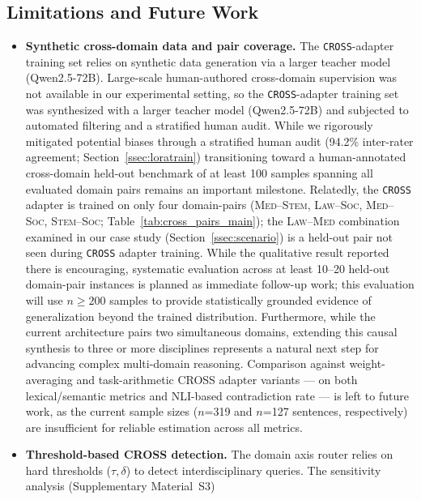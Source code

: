\documentclass[a4paper,fleql,doubleblind]{cas-sc}
\begin{document}
\subsection{Limitations and Future Work}
\label{sec:limitations}
\begin{itemize}
\item \textbf{Synthetic cross-domain data and pair coverage.}
The \texttt{CROSS}-adapter training set relies on synthetic data generation via a
larger teacher model (Qwen2.5-72B). Large-scale human-authored cross-domain supervision was not available in our experimental setting, so the \texttt{CROSS}-adapter training set was synthesized with a larger teacher model (Qwen2.5-72B) and subjected to automated filtering and a stratified human audit. While we rigorously mitigated potential biases through
a stratified human audit (94.2\% inter-rater agreement;
Section~\ref{ssec:loratrain}) transitioning toward a human-annotated cross-domain held-out benchmark
of at least 100 samples spanning all evaluated domain pairs remains an
important milestone. Relatedly, the \texttt{CROSS} adapter is trained on only four
domain-pairs (\textsc{Med}--\textsc{Stem}, \textsc{Law}--\textsc{Soc},
\textsc{Med}--\textsc{Soc}, \textsc{Stem}--\textsc{Soc};
Table~\ref{tab:cross_pairs_main}); the \textsc{Law}--\textsc{Med} combination
examined in our case study (Section~\ref{ssec:scenario}) is a held-out pair
not seen during \texttt{CROSS} adapter training. While the qualitative result reported there is encouraging, systematic
evaluation across at least 10--20 held-out domain-pair instances is planned
as immediate follow-up work; this evaluation will use $n{\geq}200$ samples to provide statistically grounded
evidence of generalization beyond the trained distribution. Furthermore, while the current architecture pairs
two simultaneous domains, extending this causal synthesis to three or more
disciplines represents a natural next step for advancing complex
multi-domain reasoning.
Comparison against weight-averaging and task-arithmetic CROSS adapter variants --- on both lexical/semantic metrics and NLI-based contradiction rate --- is left to future work, as the current sample sizes ($n$=319 and $n$=127 sentences, respectively) are insufficient for reliable estimation across all metrics.
\item \textbf{Threshold-based CROSS detection.} The domain axis router relies on hard thresholds ($\tau, \delta$) to detect
interdisciplinary queries. The sensitivity analysis (Supplementary Material~S3)

\end{itemize}
\end{document}
